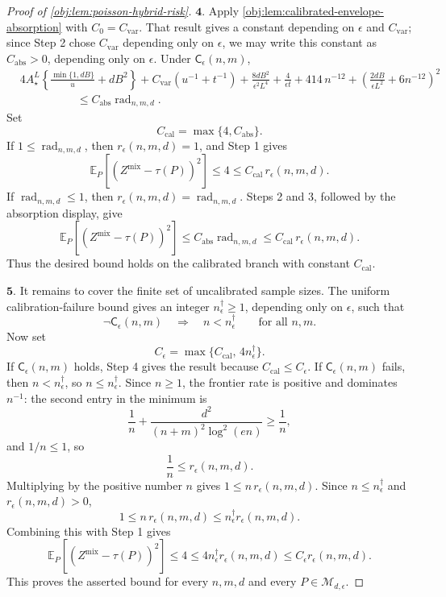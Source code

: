 \documentclass[11pt]{article}
\begin{document}
\begin{proof}[Proof of \cref{obj:lem:poisson-hybrid-risk}]
\(\mathbf{4.}\) Apply \cref{obj:lem:calibrated-envelope-absorption} with \(C_0=C_{\mathrm{var}}\).  That result gives a constant depending on \(\epsilon\) and \(C_{\mathrm{var}}\); since Step 2 chose \(C_{\mathrm{var}}\) depending only on \(\epsilon\), we may write this constant as \(C_{\mathrm{abs}}>0\), depending only on \(\epsilon\).  Under \(\mathsf C_\epsilon(n,m)\),
\[
\begin{aligned}
&4A_\star^L
\left\{
\frac{\min\{1,dB\}}u+dB^2
\right\}
+
C_{\mathrm{var}}\left(u^{-1}+t^{-1}\right)
+
\frac{8dB^2}{\epsilon^2L^4}
+
\frac4{\epsilon t}
+
414\,n^{-12}
+
\left(
\frac{2dB}{\epsilon L^2}+6n^{-12}
\right)^2
\\
&\hspace{5em}\le
C_{\mathrm{abs}}\operatorname{rad}_{n,m,d}.
\end{aligned}
\]
Set
\[
C_{\mathrm{cal}}=\max\{4,C_{\mathrm{abs}}\}.
\]
If \(1\le \operatorname{rad}_{n,m,d}\), then \(r_\epsilon(n,m,d)=1\), and Step 1 gives
\[
\mathbb E_P\!\left[(Z^{\mathrm{mix}}-\tau(P))^2\right]
\le 4
\le C_{\mathrm{cal}}\,r_\epsilon(n,m,d).
\]
If \(\operatorname{rad}_{n,m,d}\le1\), then \(r_\epsilon(n,m,d)=\operatorname{rad}_{n,m,d}\).  Steps 2 and 3, followed by the absorption display, give
\[
\mathbb E_P\!\left[(Z^{\mathrm{mix}}-\tau(P))^2\right]
\le
C_{\mathrm{abs}}\operatorname{rad}_{n,m,d}
\le
C_{\mathrm{cal}}\,r_\epsilon(n,m,d).
\]
Thus the desired bound holds on the calibrated branch with constant \(C_{\mathrm{cal}}\).

\(\mathbf{5.}\) It remains to cover the finite set of uncalibrated sample sizes.  The uniform calibration-failure bound gives an integer \(n_\epsilon^\dagger\ge1\), depending only on \(\epsilon\), such that
\[
\neg\mathsf C_\epsilon(n,m)\quad\Longrightarrow\quad n<n_\epsilon^\dagger
\qquad\text{for all }n,m .
\]
Now set
\[
C_\epsilon=\max\{C_{\mathrm{cal}},\,4n_\epsilon^\dagger\}.
\]
If \(\mathsf C_\epsilon(n,m)\) holds, Step 4 gives the result because \(C_{\mathrm{cal}}\le C_\epsilon\).  If \(\mathsf C_\epsilon(n,m)\) fails, then \(n<n_\epsilon^\dagger\), so \(n\le n_\epsilon^\dagger\).  Since \(n\ge1\), the frontier rate is positive and dominates \(n^{-1}\): the second entry in the minimum is
\[
\frac1n+\frac{d^2}{(n+m)^2\log^2(en)}\ge \frac1n,
\]
and \(1/n\le1\), so
\[
\frac1n\le r_\epsilon(n,m,d).
\]
Multiplying by the positive number \(n\) gives \(1\le n\,r_\epsilon(n,m,d)\).  Since \(n\le n_\epsilon^\dagger\) and \(r_\epsilon(n,m,d)>0\),
\[
1\le n\,r_\epsilon(n,m,d)
\le n_\epsilon^\dagger r_\epsilon(n,m,d).
\]
Combining this with Step 1 gives
\[
\mathbb E_P\!\left[(Z^{\mathrm{mix}}-\tau(P))^2\right]
\le4
\le
4n_\epsilon^\dagger r_\epsilon(n,m,d)
\le
C_\epsilon r_\epsilon(n,m,d).
\]
This proves the asserted bound for every \(n,m,d\) and every \(P\in\mathcal M_{d,\epsilon}\).
\end{proof}
\end{document}
